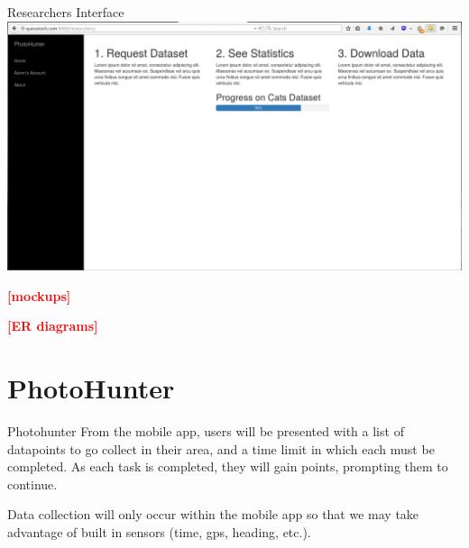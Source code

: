 \documentclass[aspectratio=169]{beamer}
\newcommand{\todo}[1]{\textcolor{red}{\textbf{[#1]}}}
\begin{document}
\begin{frame}{Researchers Interface}
  \includegraphics[width=\columnwidth]{researchers}
\end{frame}

\begin{frame}
  \todo{mockups}
\end{frame}

\begin{frame}
  \todo{ER diagrams}
\end{frame}

\section{PhotoHunter}

\begin{frame}{Photohunter}
  From the mobile app, users will be presented with a list of
  datapoints
  to go collect in their area, and a time limit in which each must be
  completed. As each task is completed, they will gain points,
  prompting
  them to continue.

  Data collection will only occur within the mobile app so that we may
  take advantage of built in sensors (time, gps, heading, etc.).
\end{frame}
\end{document}
